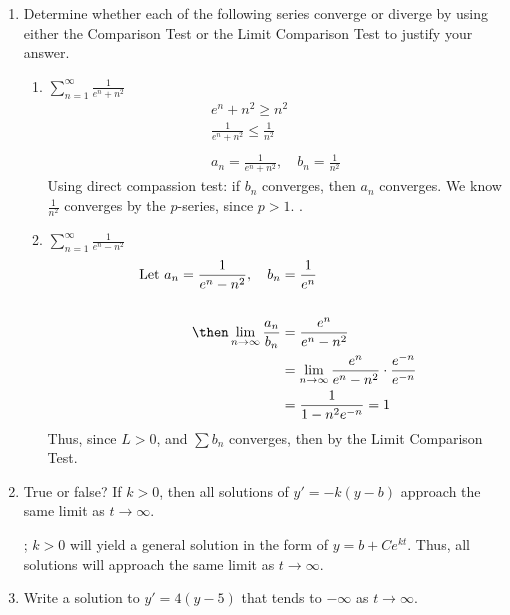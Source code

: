 \documentclass{nosvagor-notes}
\begin{document}
\begin{enumerate}
  \item Determine whether each of the following series converge or diverge by
    using either the Comparison Test or the Limit Comparison Test to justify
    your answer.
    \begin{enumerate}
      \item \(\displaystyle\sum_{n=1}^{\infty} \frac{1}{e^n + n^2}\)
        \begin{align*}
          e^n + n^2 \geq n^2 \\
          \frac{1}{e^n + n^2} \leq \frac{1}{n^2} \\\\
          a_n = \frac{1}{e^n + n^2}, \quad b_n = \frac{1}{n^2}
        \end{align*}
      Using direct compassion test: if \(b_n\) converges, then \(a_n\)
      converges. We know \(\frac{1}{n^2}\) converges by the \(p\)-series, since
      \(p > 1\). .
      \vspace{30pt}
      \item \(\displaystyle\sum_{n=1}^{\infty} \frac{1}{e^n - n^2}\)
      \begin{align*}
        ~\text{Let}~ a_n = \frac{1}{e^n - n^2}, \quad b_n &= \frac{1}{e^n} \\\\
        \then \lim_{n \to \infty} \frac{a_n}{b_n} &= \frac{e^n}{e^n-n^2}\\
           &= \lim_{n \to \infty} \frac{e^n}{e^n-n^2} \cdot \frac{e^{-n}}{e^{-n}} \\
           &= \frac{1}{1-n^2 e^{-n}} = 1
      \end{align*}
      Thus, since \(L > 0\), and \(\sum b_n\) converges, then  by the Limit Comparison Test.
    \end{enumerate}

  \newpage

  \item True or false? If \(k > 0\), then all solutions of \(y' = -k(y-b)\)
  approach the same limit as \(t \to \infty\).

  ; \(k > 0\) will yield a general solution in the form of \(y = b +
  Ce^{kt}\). Thus, all solutions will approach the same limit as \(t \to \infty\).
  \vspace{30pt}

  \item Write a solution to \(y' = 4(y-5)\) that tends to \(-\infty\) as \(t\to
  \infty\).


\end{enumerate}
\end{document}
